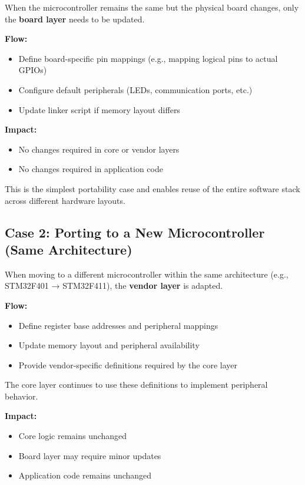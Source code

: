 When the microcontroller remains the same but the physical board changes, only the \textbf{board layer} needs to be updated.

\textbf{Flow:}
\begin{itemize}
    \item Define board-specific pin mappings (e.g., mapping logical pins to actual GPIOs)
    \item Configure default peripherals (LEDs, communication ports, etc.)
    \item Update linker script if memory layout differs
\end{itemize}

\textbf{Impact:}
\begin{itemize}
    \item No changes required in core or vendor layers
    \item No changes required in application code
\end{itemize}

This is the simplest portability case and enables reuse of the entire software stack across different hardware layouts.

\subsection*{Case 2: Porting to a New Microcontroller (Same Architecture)}

When moving to a different microcontroller within the same architecture (e.g., STM32F401 → STM32F411), the \textbf{vendor layer} is adapted.

\textbf{Flow:}
\begin{itemize}
    \item Define register base addresses and peripheral mappings
    \item Update memory layout and peripheral availability
    \item Provide vendor-specific definitions required by the core layer
\end{itemize}

The core layer continues to use these definitions to implement peripheral behavior.

\textbf{Impact:}
\begin{itemize}
    \item Core logic remains unchanged
    \item Board layer may require minor updates
    \item Application code remains unchanged
\end{itemize}

